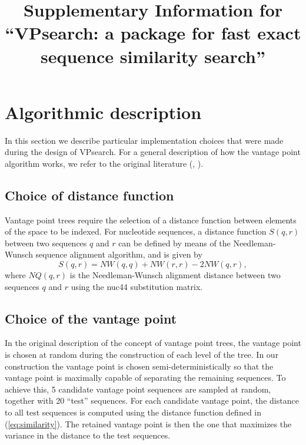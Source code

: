 \documentclass[11pt, a4paper]{article}
\begin{document}
\title{Supplementary Information for ``VPsearch: a package for fast exact
  sequence similarity search''}
\date{}

\maketitle
\tableofcontents

\section{Algorithmic description}

In this section we describe particular implementation choices that were made
during the design of VPsearch. For a general description of how the vantage
point algorithm works, we refer to the original literature
(\cite{1991-uhlmann-SatisfyingGeneralProximity},
\cite{1993-yianilos-DataStructuresAlgorithms}).

\subsection{Choice of distance function}

Vantage point trees require the selection of a distance function between
elements of the space to be indexed. For nucleotide sequences, a distance
function $S(q, r)$ between two sequences $q$ and $r$ can be defined by means of
the Needleman-Wunsch sequence alignment algorithm, and is given by
\begin{equation} \label{eq:similarity}
   S(q, r) = NW(q, q) + NW(r, r) - 2NW(q, r),
\end{equation}
where $NQ(q, r)$ is the Needleman-Wunsch alignment distance between two
sequences $q$ and $r$ using the nuc44 substitution matrix.


\subsection{Choice of the vantage point}

In the original description of the concept of vantage point trees, the vantage
point is chosen at random during the construction of each level of the tree. In
our construction the vantage point is chosen semi-deterministically so that the
vantage point is maximally capable of separating the remaining sequences. To
achieve this, 5 candidate vantage point sequences are sampled at random,
together with 20 ``test'' sequences. For each candidate vantage point, the
distance to all test sequences is computed using the distance function defined
in (\ref{eq:similarity}). The retained vantage point is then the one that
maximizes the variance in the distance to the test sequences.
\end{document}
